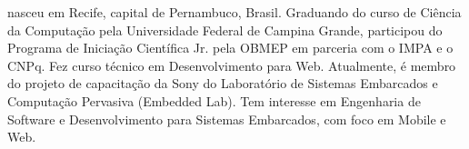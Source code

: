 \documentclass{classe_cn}                 %
\begin{document}
 nasceu em Recife, capital de Pernambuco, Brasil. Graduando do curso de Ciência da Computação pela Universidade Federal de Campina Grande, participou do Programa de Iniciação Científica Jr. pela OBMEP em parceria com o IMPA e o CNPq. Fez curso técnico em Desenvolvimento para Web. Atualmente, é membro do projeto de capacitação da Sony do Laboratório de Sistemas Embarcados e Computação Pervasiva (Embedded Lab). Tem interesse em Engenharia de Software e Desenvolvimento para Sistemas Embarcados, com foco em Mobile e Web.



\end{document}

